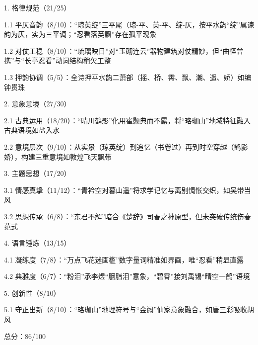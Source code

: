 \begin{tcolorbox}[
  colback=white, %
  colframe=black, 
  boxrule=1pt,        %
  arc=0mm             %
  ]
  \kaishu 
  1. 格律规范（21/25）\par
  \hspace{2em}1.1 平仄音韵（8/10）：“琼英绽”三平尾（琼-平、英-平、绽-仄，按平水韵“绽”属谏韵为仄，实为三平调；“忍看落英飘”存在孤平现象\par
  \hspace{2em}1.2 对仗工稳（8/10）：“琉璃映日”对“玉砌连云”器物建筑对仗精妙，但“曲径曾携”与“长亭忍看”动词结构稍欠工整\par
  \hspace{2em}1.3 押韵协调（5/5）：全诗押平水韵二萧部（摇、桥、霄、飘、潮、遥、娇）如编钟贯珠\par
  2. 意象意境（27/30）\par
  \hspace{2em}2.1 古典运用（18/20）：“晴川鹤影”化用崔颢典而不露，将“珞珈山”地域特征融入古典语境如盐入水\par
  \hspace{2em}2.2 意境层次（9/10）：从实景（琼英绽）到追忆（书卷过）再到时空穿越（鹤影娇），构建三重意境如敦煌飞天飘带\par
  3. 主题思想（17/20）\par
  \hspace{2em}3.1 情感真挚（11/12）：“青衿空对暮山遥”将求学记忆与离别惆怅交织，如吴带当风\par
  \hspace{2em}3.2 思想传承（6/8）：“东君不解”暗合《楚辞》司春之神原型，但未突破传统伤春范式\par
  4. 语言锤炼（13/15）\par
  \hspace{2em}4.1 凝练度（7/8）：“万点飞花迷画槛”数字量词精准如界画，唯“忍看”稍显直露\par
  \hspace{2em}4.2 典雅度（6/7）：“粉泪”承李煜“胭脂泪”意象，“碧霄”接刘禹锡“晴空一鹤”语境\par
  5. 创新性（8/10）\par
  \hspace{2em}5.1 守正出新（8/10）：“珞珈山”地理符号与“金阙”仙家意象融合，如唐三彩吸收胡风\par
  总分：86/100
\end{tcolorbox}

